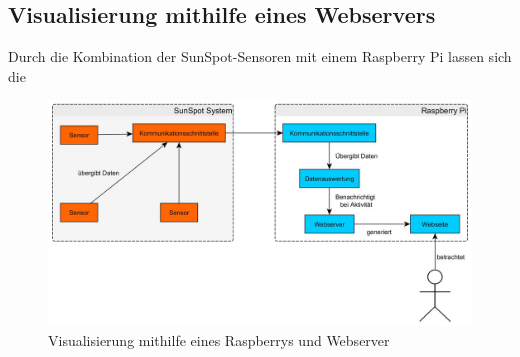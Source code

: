 \subsection{Visualisierung mithilfe eines Webservers}\label{ss:visualisierung}

Durch die Kombination der SunSpot-Sensoren mit einem Raspberry Pi lassen sich die

\begin{figure}[H] 
	\centering
	\includegraphics[scale=0.25]{Bilder/Visualisierung}
	\caption{Visualisierung mithilfe eines Raspberrys und Webserver}
	\label{f:visualisierung}
\end{figure}